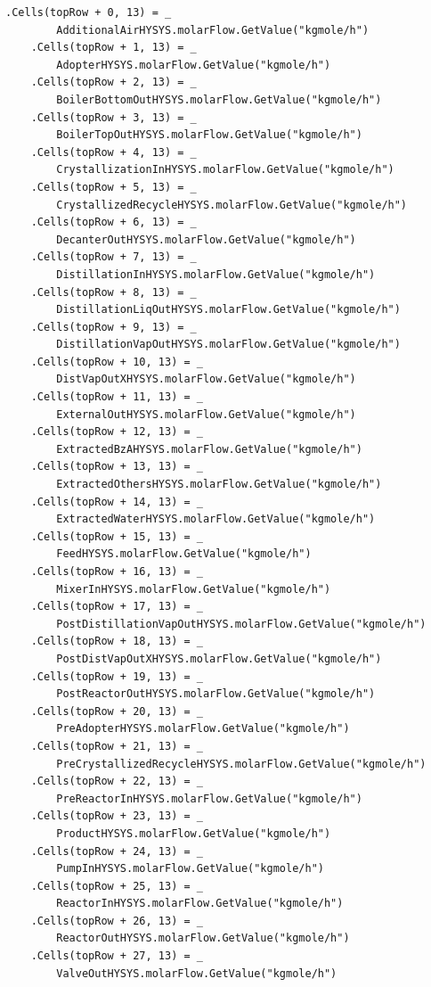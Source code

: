 \documentclass[a4j]{jsreport}
\begin{document}
\begin{lstlisting}[caption=HYSYSとpythonを繋ぐコード]
    .Cells(topRow + 0, 13) = _
        AdditionalAirHYSYS.molarFlow.GetValue("kgmole/h")
    .Cells(topRow + 1, 13) = _
        AdopterHYSYS.molarFlow.GetValue("kgmole/h")
    .Cells(topRow + 2, 13) = _
        BoilerBottomOutHYSYS.molarFlow.GetValue("kgmole/h")
    .Cells(topRow + 3, 13) = _
        BoilerTopOutHYSYS.molarFlow.GetValue("kgmole/h")
    .Cells(topRow + 4, 13) = _
        CrystallizationInHYSYS.molarFlow.GetValue("kgmole/h")
    .Cells(topRow + 5, 13) = _
        CrystallizedRecycleHYSYS.molarFlow.GetValue("kgmole/h")
    .Cells(topRow + 6, 13) = _
        DecanterOutHYSYS.molarFlow.GetValue("kgmole/h")
    .Cells(topRow + 7, 13) = _
        DistillationInHYSYS.molarFlow.GetValue("kgmole/h")
    .Cells(topRow + 8, 13) = _
        DistillationLiqOutHYSYS.molarFlow.GetValue("kgmole/h")
    .Cells(topRow + 9, 13) = _
        DistillationVapOutHYSYS.molarFlow.GetValue("kgmole/h")
    .Cells(topRow + 10, 13) = _
        DistVapOutXHYSYS.molarFlow.GetValue("kgmole/h")
    .Cells(topRow + 11, 13) = _
        ExternalOutHYSYS.molarFlow.GetValue("kgmole/h")
    .Cells(topRow + 12, 13) = _
        ExtractedBzAHYSYS.molarFlow.GetValue("kgmole/h")
    .Cells(topRow + 13, 13) = _
        ExtractedOthersHYSYS.molarFlow.GetValue("kgmole/h")
    .Cells(topRow + 14, 13) = _
        ExtractedWaterHYSYS.molarFlow.GetValue("kgmole/h")
    .Cells(topRow + 15, 13) = _
        FeedHYSYS.molarFlow.GetValue("kgmole/h")
    .Cells(topRow + 16, 13) = _
        MixerInHYSYS.molarFlow.GetValue("kgmole/h")
    .Cells(topRow + 17, 13) = _
        PostDistillationVapOutHYSYS.molarFlow.GetValue("kgmole/h")
    .Cells(topRow + 18, 13) = _
        PostDistVapOutXHYSYS.molarFlow.GetValue("kgmole/h")
    .Cells(topRow + 19, 13) = _
        PostReactorOutHYSYS.molarFlow.GetValue("kgmole/h")
    .Cells(topRow + 20, 13) = _
        PreAdopterHYSYS.molarFlow.GetValue("kgmole/h")
    .Cells(topRow + 21, 13) = _
        PreCrystallizedRecycleHYSYS.molarFlow.GetValue("kgmole/h")
    .Cells(topRow + 22, 13) = _
        PreReactorInHYSYS.molarFlow.GetValue("kgmole/h")
    .Cells(topRow + 23, 13) = _
        ProductHYSYS.molarFlow.GetValue("kgmole/h")
    .Cells(topRow + 24, 13) = _
        PumpInHYSYS.molarFlow.GetValue("kgmole/h")
    .Cells(topRow + 25, 13) = _
        ReactorInHYSYS.molarFlow.GetValue("kgmole/h")
    .Cells(topRow + 26, 13) = _
        ReactorOutHYSYS.molarFlow.GetValue("kgmole/h")
    .Cells(topRow + 27, 13) = _
        ValveOutHYSYS.molarFlow.GetValue("kgmole/h")


\end{lstlisting}
\end{document}
